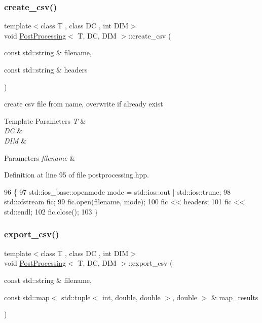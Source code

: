 \subsubsection{\texorpdfstring{create\+\_\+csv()}{create\_csv()}}
{\footnotesize\ttfamily template$<$class T , class DC , int D\+IM$>$ \\
void \hyperlink{classPostProcessing}{Post\+Processing}$<$ T, DC, D\+IM $>$\+::create\+\_\+csv (\begin{DoxyParamCaption}\item[{const std\+::string \&}]{filename,  }\item[{const std\+::string \&}]{headers }\end{DoxyParamCaption})}



create csv file from name, overwrite if already exist 


\begin{DoxyTemplParams}{Template Parameters}
{\em T} & \\
\hline
{\em DC} & \\
\hline
{\em D\+IM} & \\
\hline
\end{DoxyTemplParams}

\begin{DoxyParams}{Parameters}
{\em filename} & \\
\hline
\end{DoxyParams}


Definition at line 95 of file postprocessing.\+hpp.


\begin{DoxyCode}
96                                                                       \{
97   std::ios\_base::openmode mode = std::ios::out | std::ios::trunc;
98   std::ofstream fic;
99   fic.open(filename, mode);
100   fic << headers;
101   fic << std::endl;
102   fic.close();
103 \}
\end{DoxyCode}
\mbox{\label{classPostProcessing_a0a7dab69d6e8871063ff9851393b7f86}} 
\subsubsection{\texorpdfstring{export\+\_\+csv()}{export\_csv()}}
{\footnotesize\ttfamily template$<$class T , class DC , int D\+IM$>$ \\
void \hyperlink{classPostProcessing}{Post\+Processing}$<$ T, DC, D\+IM $>$\+::export\+\_\+csv (\begin{DoxyParamCaption}\item[{const std\+::string \&}]{filename,  }\item[{const std\+::map$<$ std\+::tuple$<$ int, double, double $>$, double $>$ \&}]{map\+\_\+results }\end{DoxyParamCaption})}



